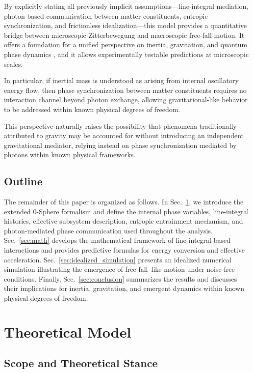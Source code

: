 \documentclass[%
 reprint,
 amsmath,amssymb,
 aps,
 prb,
]{revtex4-2}
\numberwithin{equation}{section}
\begin{document}
By explicitly stating all previously implicit assumptions—line-integral mediation, photon-based communication between matter constituents, entropic synchronization, and frictionless idealization—this model provides a quantitative bridge between microscopic Zitterbewegung and macroscopic free-fall motion. It offers a foundation for a unified perspective on inertia, gravitation, and quantum phase dynamics \cite{Jacobson1995,Verlinde2011,Padmanabhan2010}, and it allows experimentally testable predictions at microscopic scales.

In particular, if inertial mass is understood as arising from internal oscillatory energy flow, then phase synchronization between matter constituents requires no interaction channel beyond photon exchange, allowing gravitational-like behavior to be addressed within known physical degrees of freedom.

This perspective naturally raises the possibility that phenomena traditionally attributed to gravity may be accounted for without introducing an independent gravitational mediator, relying instead on phase synchronization mediated by photons within known physical frameworks.

\subsection*{Outline}

The remainder of this paper is organized as follows. In Sec.~\ref{sec:theory}, we introduce the extended 0-Sphere formalism and define the internal phase variables, line-integral histories, effective subsystem description, entropic entrainment mechanism, and photon-mediated phase communication used throughout the analysis. Sec.~\ref{sec:math} develops the mathematical framework of line-integral-based interactions and provides predictive formulas for energy conversion and effective acceleration. Sec.~\ref{sec:idealized_simulation} presents an idealized numerical simulation illustrating the emergence of free-fall–like motion under noise-free conditions. Finally, Sec.~\ref{sec:conclusion} summarizes the results and discusses their implications for inertia, gravitation, and emergent dynamics within known physical degrees of freedom.

\section{Theoretical Model}
\label{sec:theory}

\subsection{Scope and Theoretical Stance}
\end{document}
